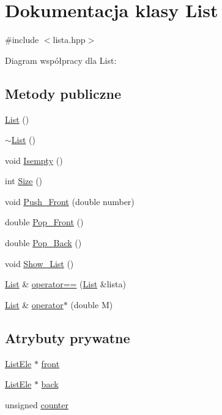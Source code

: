 \hypertarget{class_list}{\section{Dokumentacja klasy List}
\label{class_list}
}


{\ttfamily \#include $<$lista.\-hpp$>$}



Diagram współpracy dla List\-:
\subsection*{Metody publiczne}
\begin{DoxyCompactItemize}
\item 
\hyperlink{class_list_a64d878a92d11f7c63c70cbe4e7dd4176}{List} ()
\item 
\hyperlink{class_list_a70aecf37bd9d779a394e4d50377fbf5f}{$\sim$\-List} ()
\item 
void \hyperlink{class_list_ae14e825ab502fe31686bf3059ed85ed0}{Isempty} ()
\item 
int \hyperlink{class_list_a00e0054a58302c9eceb94d2ca884e6c5}{Size} ()
\item 
void \hyperlink{class_list_a31fbd443a2454901d82e4baa1732fe62}{Push\-\_\-\-Front} (double number)
\item 
double \hyperlink{class_list_a60d28fbb02bd3fc770ba0627d9345dde}{Pop\-\_\-\-Front} ()
\item 
double \hyperlink{class_list_a8b06ea3ceef6bb1b261656e78e1ba6e7}{Pop\-\_\-\-Back} ()
\item 
void \hyperlink{class_list_a25ab387de5733d3a908b730877b0f260}{Show\-\_\-\-List} ()
\item 
\hyperlink{class_list}{List} \& \hyperlink{class_list_a7c478a92a9c02c8948e4495ab8e9acc1}{operator==} (\hyperlink{class_list}{List} \&lista)
\item 
\hyperlink{class_list}{List} \& \hyperlink{class_list_ae49de6522570c22c3dc2d695cbb4ecbf}{operator$\ast$} (double M)
\end{DoxyCompactItemize}
\subsection*{Atrybuty prywatne}
\begin{DoxyCompactItemize}
\item 
\hyperlink{struct_list_ele}{List\-Ele} $\ast$ \hyperlink{class_list_a1bca2e220bb62fc97b3d2952ee6aadec}{front}
\item 
\hyperlink{struct_list_ele}{List\-Ele} $\ast$ \hyperlink{class_list_ab64659e8fecbb40c66a0f63e6b6e14cb}{back}
\item 
unsigned \hyperlink{class_list_aa9b0031d0c9e9e4805c021fbbcc41b14}{counter}
\end{DoxyCompactItemize}


